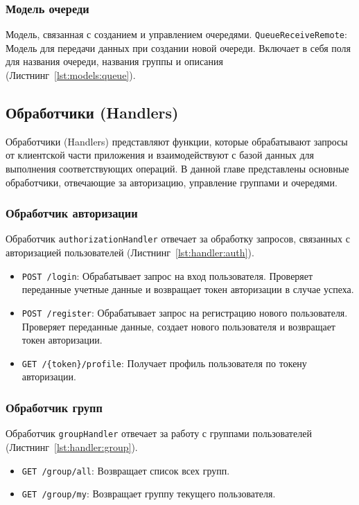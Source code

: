 \subsubsection{Модель очереди}
Модель, связанная с созданием и управлением очередями.
\texttt{QueueReceiveRemote}: Модель для передачи данных
при создании новой очереди. Включает в себя поля для названия очереди,
названия группы и описания
(Листнинг~\ref{lst:models:queue}).

\subsection{Обработчики (Handlers)}

Обработчики (Handlers) представляют функции,
которые обрабатывают запросы от клиентской части приложения
и взаимодействуют с базой данных для выполнения соответствующих операций.
В данной главе представлены основные обработчики, отвечающие за авторизацию,
управление группами и очередями.

\subsubsection{Обработчик авторизации}
Обработчик \texttt{authorizationHandler} отвечает за обработку запросов,
связанных с авторизацией пользователей
(Листнинг~\ref{lst:handler:auth}).

\begin{itemize}
    \item \texttt{POST /login}: Обрабатывает запрос на вход пользователя.
		Проверяет переданные учетные данные и возвращает токен авторизации
		в случае успеха.
    \item \texttt{POST /register}: Обрабатывает запрос на регистрацию нового
		пользователя. Проверяет переданные данные,
		создает нового пользователя и возвращает токен авторизации.
    \item \texttt{GET /\{token\}/profile}: Получает профиль пользователя
		по токену авторизации.
\end{itemize}

\subsubsection{Обработчик групп}
Обработчик \texttt{groupHandler} отвечает за работу с группами пользователей
(Листнинг~\ref{lst:handler:group}).

\begin{itemize}
    \item \texttt{GET /group/all}: Возвращает список всех групп.
    \item \texttt{GET /group/my}: Возвращает группу текущего пользователя.
\end{itemize}

